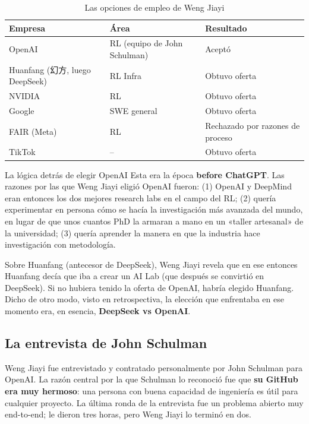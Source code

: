 \begin{table}[H]
\centering
\begin{tabular}{lll}
\toprule
\textbf{Empresa} & \textbf{Área} & \textbf{Resultado} \\
\midrule
OpenAI & RL (equipo de John Schulman) & Aceptó \\
Huanfang (幻方, luego DeepSeek) & RL Infra & Obtuvo oferta \\
NVIDIA & RL & Obtuvo oferta \\
Google & SWE general & Obtuvo oferta \\
FAIR (Meta) & RL & Rechazado por razones de proceso \\
TikTok & -- & Obtuvo oferta \\
\bottomrule
\end{tabular}
\caption{Las opciones de empleo de Weng Jiayi}
\end{table}

\begin{importantbox}{La lógica detrás de elegir OpenAI}
Esta era la época \textbf{before ChatGPT}. Las razones por las que Weng Jiayi eligió OpenAI fueron: (1) OpenAI y DeepMind eran entonces los dos mejores research labs en el campo del RL; (2) quería experimentar en persona cómo se hacía la investigación más avanzada del mundo, en lugar de que unos cuantos PhD la armaran a mano en un «taller artesanal» de la universidad; (3) quería aprender la manera en que la industria hace investigación con metodología.
\end{importantbox}

Sobre Huanfang (antecesor de DeepSeek), Weng Jiayi revela que en ese entonces Huanfang decía que iba a crear un AI Lab (que después se convirtió en DeepSeek). Si no hubiera tenido la oferta de OpenAI, habría elegido Huanfang. Dicho de otro modo, visto en retrospectiva, la elección que enfrentaba en ese momento era, en esencia, \textbf{DeepSeek vs OpenAI}.

\subsection{La entrevista de John Schulman}

Weng Jiayi fue entrevistado y contratado personalmente por John Schulman para OpenAI. La razón central por la que Schulman lo reconoció fue que \textbf{su GitHub era muy hermoso}: una persona con buena capacidad de ingeniería es útil para cualquier proyecto. La última ronda de la entrevista fue un problema abierto muy end-to-end; le dieron tres horas, pero Weng Jiayi lo terminó en dos.

